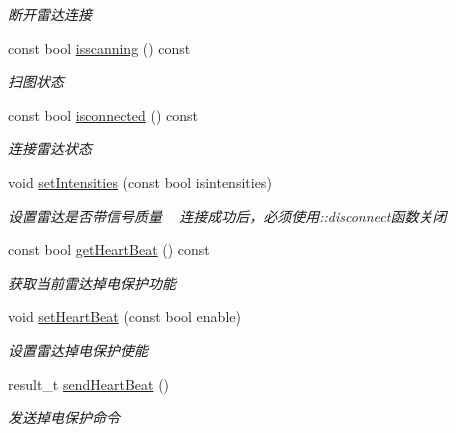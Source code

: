 \begin{DoxyCompactItemize}
\begin{DoxyCompactList}\small\item\em 断开雷达连接 \end{DoxyCompactList}\item 
const bool \hyperlink{classydlidar_1_1_y_dlidar_driver_a37cd2766dec3536848aa25c88d9d1ea9}{isscanning} () const 
\begin{DoxyCompactList}\small\item\em 扫图状态 ~\newline
\end{DoxyCompactList}\item 
const bool \hyperlink{classydlidar_1_1_y_dlidar_driver_a2553d28304faa4acab6bd63e7c6c2ee6}{isconnected} () const 
\begin{DoxyCompactList}\small\item\em 连接雷达状态 ~\newline
\end{DoxyCompactList}\item 
void \hyperlink{classydlidar_1_1_y_dlidar_driver_a406ae191df8a2a2fa90de4175cfe9d4c}{set\+Intensities} (const bool isintensities)
\begin{DoxyCompactList}\small\item\em 设置雷达是否带信号质量 ~\newline
连接成功后，必须使用\+::disconnect函数关闭 \end{DoxyCompactList}\item 
const bool \hyperlink{classydlidar_1_1_y_dlidar_driver_a36b01c5124032be12ecbeffeefd38742}{get\+Heart\+Beat} () const 
\begin{DoxyCompactList}\small\item\em 获取当前雷达掉电保护功能 ~\newline
\end{DoxyCompactList}\item 
void \hyperlink{classydlidar_1_1_y_dlidar_driver_ab2bf62735be18019864c12f0e462c4a2}{set\+Heart\+Beat} (const bool enable)
\begin{DoxyCompactList}\small\item\em 设置雷达掉电保护使能 ~\newline
\end{DoxyCompactList}\item 
result\+\_\+t \hyperlink{classydlidar_1_1_y_dlidar_driver_a6e7dc7cd2a73d24a763cebde840a5d30}{send\+Heart\+Beat} ()
\begin{DoxyCompactList}\small\item\em 发送掉电保护命令 ~\newline

\end{DoxyCompactList}
\end{DoxyCompactItemize}
